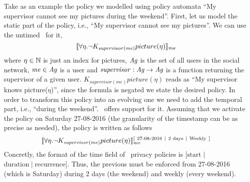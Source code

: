 \begin{enumerate}
  \begin{example}
  Take as an example the policy we modelled using policy automata ``My supervisor cannot see my pictures during the weekend''. First, let us model the static part of the policy, i.e., ``My supervisor cannot see my pictures''. We can use the untimed \ppl~for it,
  $$ \llbracket \forall \eta. \neg K_{\mathit{supervisor(me)}} picture(\eta) \rrbracket_{\mathit{me}}$$
  where $\eta \in \mathbb{N}$ is just an index for pictures, $\mathit{Ag}$ is the set of all users in the social network, $\mathit{me} \in \mathit{Ag}$ is a user and $\mathit{supervisor} : \mathit{Ag} \rightarrow \mathit{Ag}$ is a function returning the supervisor of a given user. $K_{\mathit{supervisor(me)}} picture(\eta)$ reads as ``My supervisor knows picture($\eta$)'', since the formula is negated we state the desired policy. In order to transform this policy into an evolving one we need to add the temporal part, i.e., ``during the weekend''. \tppl~offers support for it. Assuming that we activate the policy on Saturday 27-08-2016 (the granularity of the timestamp can be as precise as needed), the policy is written as follows
  $$\llbracket \forall \eta. \neg K_{\mathit{supervisor(me)}} picture(\eta) \rrbracket_{\mathit{me}}^{[ ~ \text{27-08-2016} ~ \mid ~ \text{2 days} ~ \mid ~ \text{Weekly} ~ ]}$$
  Concretly, the format of the time field of \tppl~privacy policies is $[\text{start} $ $\mid $ $\text{duration} \mid \text{recurrence} ]$. Thus, the previous must be enforced from 27-08-2016 (which is Saturday) during 2 days (the weekend) and weekly (every weekend).
    \end{example}
\end{enumerate}
